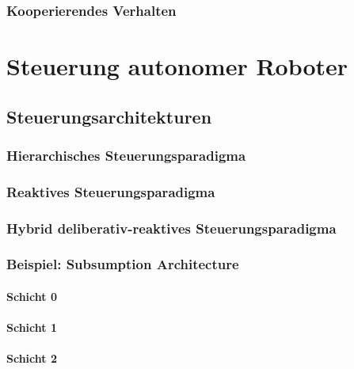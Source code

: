 \documentclass[a4paper, 11pt, accentcolor = tud3b]{tudreport}
\begin{document}
			\subsection{Kooperierendes Verhalten} %

	\chapter{Steuerung autonomer Roboter} %

		\section{Steuerungsarchitekturen} %

			\subsection{Hierarchisches Steuerungsparadigma} %

			\subsection{Reaktives Steuerungsparadigma} %

			\subsection{Hybrid deliberativ-reaktives Steuerungsparadigma} %

			\subsection{Beispiel: Subsumption Architecture} %

				\subsubsection{Schicht 0} %

				\subsubsection{Schicht 1} %

				\subsubsection{Schicht 2} %
\end{document}
